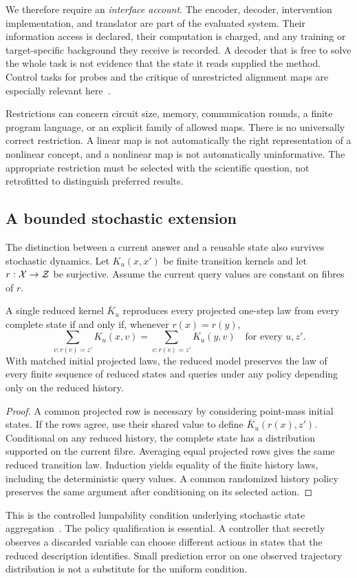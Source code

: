 We therefore require an \emph{interface account}. The encoder, decoder, intervention implementation, and translator are part of the evaluated system. Their information access is declared, their computation is charged, and any training or target-specific background they receive is recorded. A decoder that is free to solve the whole task is not evidence that the state it reads supplied the method. Control tasks for probes and the critique of unrestricted alignment maps are especially relevant here~\cite{MU:hewitt,MU:sutter}.

Restrictions can concern circuit size, memory, communication rounds, a finite program language, or an explicit family of allowed maps. There is no universally correct restriction. A linear map is not automatically the right representation of a nonlinear concept, and a nonlinear map is not automatically uninformative. The appropriate restriction must be selected with the scientific question, not retrofitted to distinguish preferred results.

\subsection{A bounded stochastic extension}
The distinction between a current answer and a reusable state also survives stochastic dynamics. Let $K_u(x,x')$ be finite transition kernels and let $r:\mathcal X\to\mathcal Z$ be surjective. Assume the current query values are constant on fibres of $r$.

\begin{MUproposition}\label{MU:prop:lumpability}
A single reduced kernel $\bar K_u$ reproduces every projected one-step law from every complete state if and only if, whenever $r(x)=r(y)$,
\[
\sum_{v:r(v)=z'}K_u(x,v)=\sum_{v:r(v)=z'}K_u(y,v)
\quad\text{for every }u,z'.
\]
With matched initial projected laws, the reduced model preserves the law of every finite sequence of reduced states and queries under any policy depending only on the reduced history.
\end{MUproposition}
\begin{proof}
A common projected row is necessary by considering point-mass initial states. If the rows agree, use their shared value to define $\bar K_u(r(x),z')$. Conditional on any reduced history, the complete state has a distribution supported on the current fibre. Averaging equal projected rows gives the same reduced transition law. Induction yields equality of the finite history laws, including the deterministic query values. A common randomized history policy preserves the same argument after conditioning on its selected action.
\end{proof}
This is the controlled lumpability condition underlying stochastic state aggregation~\cite{MU:givan}. The policy qualification is essential. A controller that secretly observes a discarded variable can choose different actions in states that the reduced description identifies. Small prediction error on one observed trajectory distribution is not a substitute for the uniform condition.

